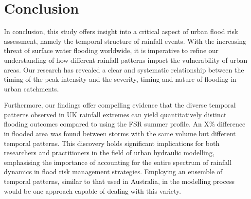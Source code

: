 \documentclass[APA,Times2COL]{WileyNJDv5}
\begin{document}

\section{Conclusion}\label{sec:conclusion}

In conclusion, this study offers insight into a critical aspect of urban flood risk assessment, namely the temporal structure of rainfall events. With the increasing threat of surface water flooding worldwide, it is imperative to refine our understanding of how different rainfall patterns impact the vulnerability of urban areas. Our research has revealed a clear and systematic relationship between the timing of the peak intensity and the severity, timing and nature of flooding in urban catchments. 

Furthermore, our findings offer compelling evidence that the diverse temporal patterns observed in UK rainfall extremes can yield quantitatively distinct flooding outcomes compared to using the FSR summer profile. An X\% difference in flooded area was found between storms with the same volume but different temporal patterns. This discovery holds significant implications for both researchers and practitioners in the field of urban hydraulic modelling, emphasising the importance of accounting for the entire spectrum of rainfall dynamics in flood risk management strategies. Employing an ensemble of temporal patterns, similar to that used in Australia, in the modelling process would be one approach capable of dealing with this variety. 
\end{document}
